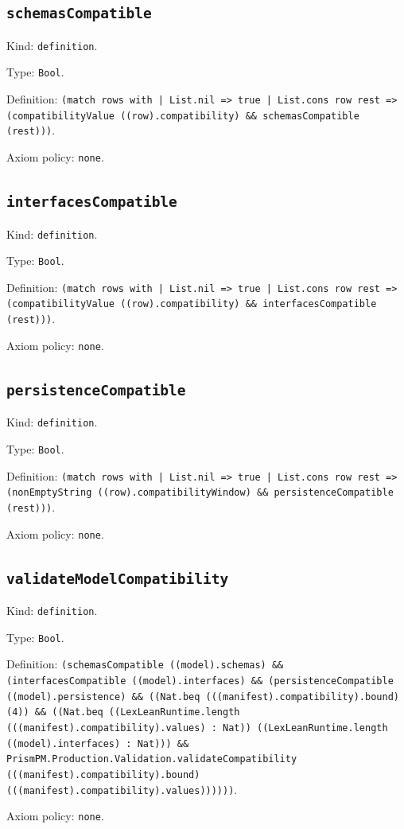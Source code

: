 \documentclass[11pt]{article}
\begin{document}
\subsection*{\texttt{schemasCompatible}}
\noindent Kind: \texttt{definition}.\par
\noindent Type: \texttt{Bool}.\par
\noindent Definition: \texttt{(match rows with | List.nil => true | List.cons row rest => (compatibilityValue ((row).compatibility) \&\& schemasCompatible (rest)))}.\par
\noindent Axiom policy: \texttt{none}.\par
\subsection*{\texttt{interfacesCompatible}}
\noindent Kind: \texttt{definition}.\par
\noindent Type: \texttt{Bool}.\par
\noindent Definition: \texttt{(match rows with | List.nil => true | List.cons row rest => (compatibilityValue ((row).compatibility) \&\& interfacesCompatible (rest)))}.\par
\noindent Axiom policy: \texttt{none}.\par
\subsection*{\texttt{persistenceCompatible}}
\noindent Kind: \texttt{definition}.\par
\noindent Type: \texttt{Bool}.\par
\noindent Definition: \texttt{(match rows with | List.nil => true | List.cons row rest => (nonEmptyString ((row).compatibilityWindow) \&\& persistenceCompatible (rest)))}.\par
\noindent Axiom policy: \texttt{none}.\par
\subsection*{\texttt{validateModelCompatibility}}
\noindent Kind: \texttt{definition}.\par
\noindent Type: \texttt{Bool}.\par
\noindent Definition: \texttt{(schemasCompatible ((model).schemas) \&\& (interfacesCompatible ((model).interfaces) \&\& (persistenceCompatible ((model).persistence) \&\& ((Nat.beq (((manifest).compatibility).bound) (4)) \&\& ((Nat.beq ((LexLeanRuntime.length (((manifest).compatibility).values) : Nat)) ((LexLeanRuntime.length ((model).interfaces) : Nat))) \&\& PrismPM.Production.Validation.validateCompatibility (((manifest).compatibility).bound) (((manifest).compatibility).values))))))}.\par
\noindent Axiom policy: \texttt{none}.\par
\end{document}
